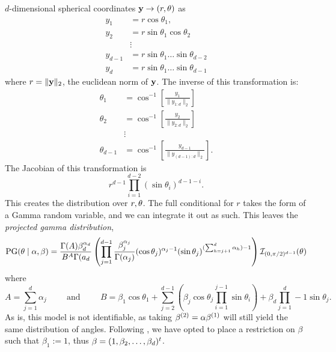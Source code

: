   $d$-dimensional spherical coordinates ${\bf y} \rightarrow (r,{\bf \theta})$ as
  \begin{equation}
    \label{eqn:transform}
    \begin{aligned}
      y_1     &= r\cos\theta_1,\\
      y_2     &= r\sin\theta_1\cos\theta_2\\
              &\vdots\\
      y_{d-1} &= r\sin\theta_1\ldots\sin\theta_{d-2}\\
      y_{d}   &= r\sin\theta_1\ldots\sin\theta_{d-1}
    \end{aligned}
  \end{equation}
  where $r = \lVert {\bf y}\rVert_{2}$, the euclidean norm of ${\bf y}$.  The inverse of this
  transformation is:
  \begin{equation}
    \label{eqn:invtransform}
    \begin{aligned}
      \theta_1     &= \cos^{-1}\left[\frac{y_1}{\lVert y_{1:d}\rVert_2}\right]\\
      \theta_2     &= \cos^{-1}\left[\frac{y_2}{\lVert y_{2:d}\rVert_2}\right]\\
                   &\vdots\\
      \theta_{d-1} &= \cos^{-1}\left[\frac{y_{d-1}}{\lVert y_{(d-1):d}\rVert_2}\right].
    \end{aligned}
  \end{equation}
  The Jacobian of this transformation is
  \begin{equation*}
    r^{d-1}\prod_{i = 1}^{d-2}(\sin\theta_i)^{d-1-i}.
  \end{equation*}
  This creates the distribution over $r,{\bf \theta}$.  The full conditional for
    $r$ takes the form of a Gamma random variable, and we can integrate it out as
    such.  This leaves the \emph{projected gamma distribution},
  \begin{equation}
    \text{PG}({\bf \theta}\mid{\bf \alpha},{\bf \beta}) = \frac{\Gamma(A)\beta_d^{\alpha_d}}{B^A\Gamma(a_d}\left(\prod_{j = 1}^{d-1}\frac{\beta_j^{\alpha_j}}{\Gamma(\alpha_j)}(\cos\theta_j)^{\alpha_j - 1}(\sin\theta_j)^{(\sum_{h = j + 1}^d\alpha_h) - 1}\right)\mathcal{I}_{(0,\pi/2)^{d-1}}({\bf \theta})
  \end{equation}
  where
  \begin{equation}
    A = \sum_{j = 1}^d\alpha_j \hspace{1cm}\text{and}\hspace{1cm}B = \beta_1\cos\theta_1 + \sum_{j = 2}^{d-1}\left(\beta_j\cos\theta_j\prod_{i = 1}^{j-1}\sin\theta_i\right) + \beta_d\prod_{j = 1}^d-1\sin\theta_j.
  \end{equation}
As is, this model is not identifiable, as taking
  ${\bf \beta}^{(2)} = \alpha {\bf \beta}^{(1)}$ will still yield the same
  distribution of angles. Following \cite{nunez2019}, we have opted to place a
  restriction on $\beta$ such that $\beta_1 := 1$, thus
  ${\bf \beta} = (1, \beta_2, \ldots, \beta_d)^t$.

